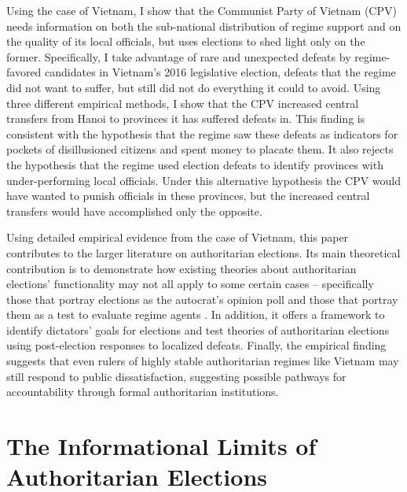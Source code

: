\documentclass[12pt]{article}
\newcommand{\1}{\mathbbm{1}}
\begin{document}
Using the case of Vietnam, I show that the Communist Party of Vietnam (CPV) needs information on both the sub-national distribution of regime support and on the quality of its local officials, but uses elections to shed light only on the former. Specifically, I take advantage of rare and unexpected defeats by regime-favored candidates in Vietnam's 2016 legislative election, defeats that the regime did not want to suffer, but still did not do everything it could to avoid. Using three different empirical methods, I show that the CPV increased central transfers from Hanoi to provinces it has suffered defeats in. This finding is consistent with the hypothesis that the regime saw these defeats as indicators for pockets of disillusioned citizens and spent money to placate them. It also rejects the hypothesis that the regime used election defeats to identify provinces with under-performing local officials. Under this alternative hypothesis the CPV would have wanted to punish officials in these provinces, but the increased central transfers would have accomplished only the opposite.

Using detailed empirical evidence from the case of Vietnam, this paper contributes to the larger literature on authoritarian elections. Its main theoretical contribution is to demonstrate how existing theories about authoritarian elections' functionality may not all apply to some certain cases -- specifically those that portray elections as the autocrat's opinion poll \citep[e.g.][]{Miller2015, Magaloni2006, Blaydes2010} and those that portray them as a test to evaluate regime agents \citep[e.g.][]{Magaloni2006, Blaydes2010,Myagkov2009,RundlettSvolik2016}. In addition, it offers a framework to identify dictators' goals for elections and test theories of authoritarian elections using post-election responses to localized defeats. Finally, the empirical finding suggests that even rulers of highly stable authoritarian regimes like Vietnam may still respond to public dissatisfaction, suggesting possible pathways for accountability through formal authoritarian institutions.

\section{The Informational Limits of Authoritarian Elections}
\label{sec:theory_limits}
\end{document}
